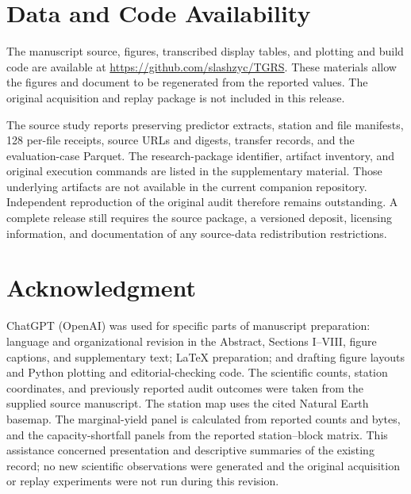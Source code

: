 \section*{Data and Code Availability}
The manuscript source, figures, transcribed display tables, and plotting and build code are available at \url{https://github.com/slashzyc/TGRS}. These materials allow the figures and document to be regenerated from the reported values. The original acquisition and replay package is not included in this release.

The source study reports preserving predictor extracts, station and file manifests, 128 per-file receipts, source URLs and digests, transfer records, and the evaluation-case Parquet. The research-package identifier, artifact inventory, and original execution commands are listed in the supplementary material. Those underlying artifacts are not available in the current companion repository. Independent reproduction of the original audit therefore remains outstanding. A complete release still requires the source package, a versioned deposit, licensing information, and documentation of any source-data redistribution restrictions.

\section*{Acknowledgment}
ChatGPT (OpenAI) was used for specific parts of manuscript preparation: language and organizational revision in the Abstract, Sections I--VIII, figure captions, and supplementary text; LaTeX preparation; and drafting figure layouts and Python plotting and editorial-checking code. The scientific counts, station coordinates, and previously reported audit outcomes were taken from the supplied source manuscript. The station map uses the cited Natural Earth basemap. The marginal-yield panel is calculated from reported counts and bytes, and the capacity-shortfall panels from the reported station--block matrix. This assistance concerned presentation and descriptive summaries of the existing record; no new scientific observations were generated and the original acquisition or replay experiments were not run during this revision.
